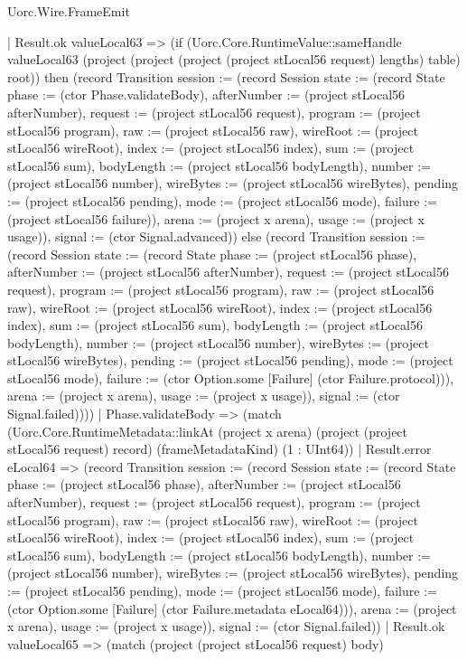 \begin{lexlean}{Uorc.Wire.FrameEmit}
\begin{semanticmodule}
{          | Result.ok valueLocal63 => (if (Uorc.Core.RuntimeValue::sameHandle valueLocal63 (project (project (project (project stLocal56 request) lengths) table) root)) then (record Transition {session := (record Session {state := (record State {phase := (ctor Phase.validateBody), afterNumber := (project stLocal56 afterNumber), request := (project stLocal56 request), program := (project stLocal56 program), raw := (project stLocal56 raw), wireRoot := (project stLocal56 wireRoot), index := (project stLocal56 index), sum := (project stLocal56 sum), bodyLength := (project stLocal56 bodyLength), number := (project stLocal56 number), wireBytes := (project stLocal56 wireBytes), pending := (project stLocal56 pending), mode := (project stLocal56 mode), failure := (project stLocal56 failure)}), arena := (project x arena), usage := (project x usage)}), signal := (ctor Signal.advanced)}) else (record Transition {session := (record Session {state := (record State {phase := (project stLocal56 phase), afterNumber := (project stLocal56 afterNumber), request := (project stLocal56 request), program := (project stLocal56 program), raw := (project stLocal56 raw), wireRoot := (project stLocal56 wireRoot), index := (project stLocal56 index), sum := (project stLocal56 sum), bodyLength := (project stLocal56 bodyLength), number := (project stLocal56 number), wireBytes := (project stLocal56 wireBytes), pending := (project stLocal56 pending), mode := (project stLocal56 mode), failure := (ctor Option.some [Failure] (ctor Failure.protocol))}), arena := (project x arena), usage := (project x usage)}), signal := (ctor Signal.failed)})))
        | Phase.validateBody => (match (Uorc.Core.RuntimeMetadata::linkAt (project x arena) (project (project stLocal56 request) record) (frameMetadataKind) (1 : UInt64))
          | Result.error eLocal64 => (record Transition {session := (record Session {state := (record State {phase := (project stLocal56 phase), afterNumber := (project stLocal56 afterNumber), request := (project stLocal56 request), program := (project stLocal56 program), raw := (project stLocal56 raw), wireRoot := (project stLocal56 wireRoot), index := (project stLocal56 index), sum := (project stLocal56 sum), bodyLength := (project stLocal56 bodyLength), number := (project stLocal56 number), wireBytes := (project stLocal56 wireBytes), pending := (project stLocal56 pending), mode := (project stLocal56 mode), failure := (ctor Option.some [Failure] (ctor Failure.metadata eLocal64))}), arena := (project x arena), usage := (project x usage)}), signal := (ctor Signal.failed)})
          | Result.ok valueLocal65 => (match (project (project stLocal56 request) body)
}
\end{semanticmodule}
\end{lexlean}
